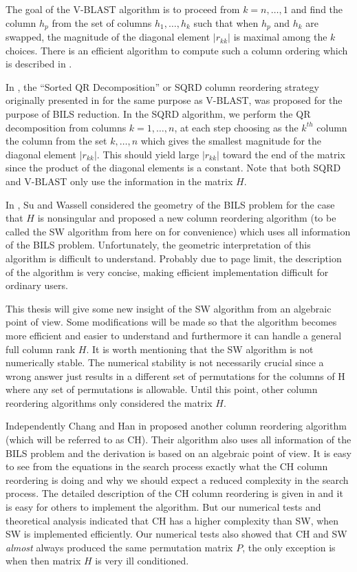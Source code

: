 \documentclass[12pt,Bold,letterpaper]{mcgilletdclass}
\begin{document}
The goal of the V-BLAST algorithm is to proceed from $k=n, \dots,1$ and find the column $h_p$ from the set of columns $h_1, \dots, h_k$ such that when $h_p$ and $h_k$ are swapped, the magnitude of the diagonal element $|r_{kk}|$ is maximal among the $k$ choices. There is an efficient algorithm to compute such a column ordering which is described in \cite{ChaP07}.

In \cite{ChaH05}, the ``Sorted QR Decomposition'' or SQRD column reordering strategy originally presented in \cite{WubBRKK01} for the same purpose as V-BLAST, was proposed for the purpose of BILS reduction. In the SQRD algorithm, we perform the QR decomposition from columns $k = 1,\dots, n$, at each step choosing as the $k^{th}$ column the column from the set $k,\dots,n$ which gives the smallest magnitude for the diagonal element $|r_{kk}|$. This should yield large $|r_{kk}|$ toward the end of the matrix since the product of the diagonal elements is a constant. Note that both SQRD and V-BLAST only use the information in the matrix $H$.

In \cite{SuW05}, Su and Wassell considered the geometry of the BILS
problem for the case that $H$ is nonsingular and proposed a new column reordering algorithm (to be called
the SW algorithm from here on for convenience) which uses all information of the BILS problem.
Unfortunately, the geometric interpretation of this algorithm is difficult to understand.
Probably due to page limit, the description of the algorithm is very concise, 
making efficient implementation difficult for ordinary users.

This thesis will give some new insight of the SW algorithm from an algebraic point of view.
Some modifications will be made so that the algorithm becomes more efficient
and easier to understand and furthermore it can handle a general full column rank $H$.
It is worth mentioning that the SW algorithm is not numerically stable. The numerical stability is not
necessarily crucial since a wrong answer just results in a different set of
permutations for the columns of H where any set of permutations is allowable.
Until this point, other column reordering algorithms only considered the matrix $H$.

Independently  Chang and Han in \cite{ChaH05} proposed
another column reordering algorithm (which will be referred to as  CH).
Their algorithm also uses all information of the BILS problem and the derivation
is based on an algebraic point of view. It is  easy to see from the equations in
the search process exactly what the CH column reordering is doing and why we
should expect a reduced complexity in the search process. The detailed
description of the CH column reordering is given in \cite{ChaH05} and it is easy
for others to implement the algorithm.
But our numerical tests and theoretical analysis indicated that CH has a higher complexity than SW, when SW
is implemented efficiently.
Our numerical tests also showed that CH and SW {\em almost} always   
produced the same permutation matrix $P$, the only exception is when then matrix $H$ is very ill conditioned.
\end{document}
